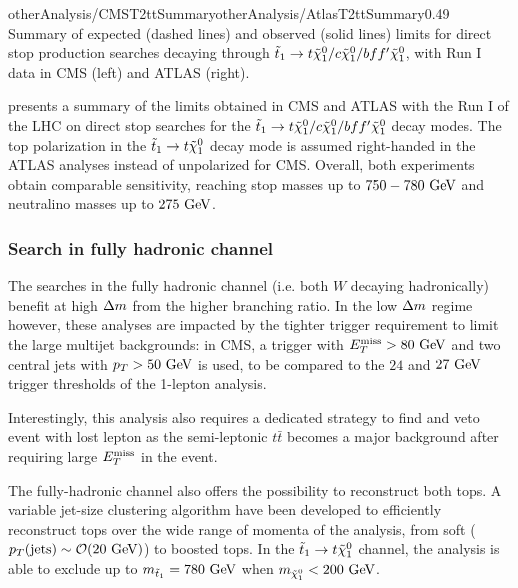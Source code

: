     {otherAnalysis/CMST2ttSummary}{otherAnalysis/AtlasT2ttSummary}{0.49}
    {Summary of expected (dashed lines) and observed (solid lines) limits for
    direct stop production searches decaying through $\tilde{t}_1 \rightarrow t
    \tilde{\chi}_1^0 / c \tilde{\chi}_1^0 / b ff' \tilde{\chi}_1^0$, with Run I data in CMS
    (left) and ATLAS (right).}

     presents a summary of the limits obtained in CMS
    and ATLAS with the Run I of the LHC on direct stop searches for the $\tilde{t}_1
    \rightarrow t \tilde{\chi}_1^0 / c \tilde{\chi}_1^0 / b ff' \tilde{\chi}_1^0$ decay
    modes. The top polarization in the $\tilde{t}_1 \rightarrow t \tilde{\chi}_1^0$ decay
    mode is assumed right-handed in the ATLAS analyses instead of unpolarized
    for CMS. Overall, both experiments obtain comparable sensitivity, reaching
    stop masses up to $750-780~\text{GeV}$ and neutralino masses up to $275~\text{GeV}$.

    \subsubsection{Search in fully hadronic channel}

    The searches in the fully hadronic channel (i.e. both $W$ decaying
    hadronically) \cite{SUS-13-023, ATLASstopSearches} benefit at high $\Delta m$
    from the higher branching ratio. In the low $\Delta m$ regime however, these
    analyses are impacted by the tighter trigger requirement to limit the large
    multijet backgrounds: in CMS, a trigger with $E_T^\text{miss} > 80~\text{GeV}$ and two central
    jets with $p_T > 50~\text{GeV}$ is used, to be compared to the $24$ and $27~\text{GeV}$
    trigger thresholds of the 1-lepton analysis.

    Interestingly, this analysis also requires a dedicated strategy to find and
    veto event with lost lepton as the semi-leptonic $t\bar{t}$ becomes a major
    background after requiring large $E_T^\text{miss}$ in the event.

    The fully-hadronic channel also offers the possibility to reconstruct both
    tops. A variable jet-size clustering algorithm have been developed to
    efficiently reconstruct tops over the wide range of momenta of the analysis,
    from soft ($p_T(\text{jets}) \sim \mathcal{O}(20~\text{GeV})$) to boosted tops.  In
    the $\tilde{t}_1 \rightarrow t \tilde{\chi}_1^0$ channel, the analysis is able to
    exclude up to $m_{\tilde{t}_1} = 780~\text{GeV}$ when $m_{\tilde{\chi}_1^0} <
    200~\text{GeV}$.

